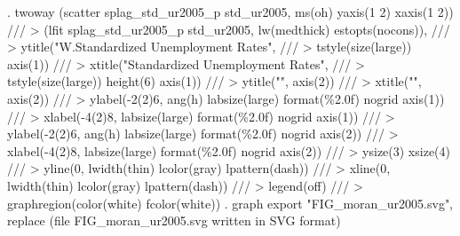 . twoway (scatter splag_std_ur2005_p std_ur2005, ms(oh) yaxis(1 2) xaxis(1 2)) ///
>         (lfit splag_std_ur2005_p std_ur2005, lw(medthick) estopts(nocons)), ///
>         ytitle("W.Standardized Unemployment Rates", ///
>                 tstyle(size(large)) axis(1)) ///
>         xtitle("Standardized Unemployment Rates", ///
>                 tstyle(size(large)) height(6) axis(1)) ///
>         ytitle("", axis(2)) ///
>         xtitle("", axis(2)) ///
>         ylabel(-2(2)6, ang(h) labsize(large) format(\%2.0f) nogrid axis(1)) ///
>         xlabel(-4(2)8, labsize(large) format(\%2.0f) nogrid axis(1)) ///
>         ylabel(-2(2)6, ang(h) labsize(large) format(\%2.0f) nogrid axis(2)) ///
>         xlabel(-4(2)8, labsize(large) format(\%2.0f) nogrid axis(2)) ///
>         ysize(3) xsize(4) ///
>         yline(0, lwidth(thin) lcolor(gray) lpattern(dash)) ///
>         xline(0, lwidth(thin) lcolor(gray) lpattern(dash)) ///
>         legend(off) ///
>         graphregion(color(white) fcolor(white))
{\smallskip}
. graph export "FIG_moran_ur2005.svg", replace
(file FIG_moran_ur2005.svg written in SVG format)
